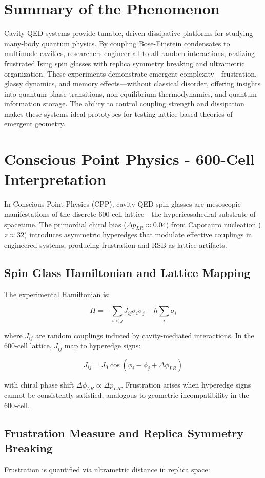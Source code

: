 \documentclass[11pt]{article}
\begin{document}
\section{Summary of the Phenomenon}
Cavity QED systems provide tunable, driven-dissipative platforms for studying many-body quantum physics. By coupling Bose-Einstein condensates to multimode cavities, researchers engineer all-to-all random interactions, realizing frustrated Ising spin glasses with replica symmetry breaking and ultrametric organization. These experiments demonstrate emergent complexity—frustration, glassy dynamics, and memory effects—without classical disorder, offering insights into quantum phase transitions, non-equilibrium thermodynamics, and quantum information storage. The ability to control coupling strength and dissipation makes these systems ideal prototypes for testing lattice-based theories of emergent geometry.

\section{Conscious Point Physics - 600-Cell Interpretation}
In Conscious Point Physics (CPP), cavity QED spin glasses are mesoscopic manifestations of the discrete 600-cell lattice—the hypericosahedral substrate of spacetime. The primordial chiral bias ($\Delta p_{LR} \approx 0.04$) from Capotauro nucleation ($z \approx 32$) introduces asymmetric hyperedges that modulate effective couplings in engineered systems, producing frustration and RSB as lattice artifacts.

\subsection{Spin Glass Hamiltonian and Lattice Mapping}
The experimental Hamiltonian is:

\[
H = -\sum_{i<j} J_{ij} \sigma_i \sigma_j - h \sum_i \sigma_i
\]

where $J_{ij}$ are random couplings induced by cavity-mediated interactions. In the 600-cell lattice, $J_{ij}$ map to hyperedge signs:

\[
J_{ij} = J_0 \cos(\phi_i - \phi_j + \Delta \phi_{LR})
\]

with chiral phase shift $\Delta \phi_{LR} \propto \Delta p_{LR}$. Frustration arises when hyperedge signs cannot be consistently satisfied, analogous to geometric incompatibility in the 600-cell.

\subsection{Frustration Measure and Replica Symmetry Breaking}
Frustration is quantified via ultrametric distance in replica space:
\end{document}
